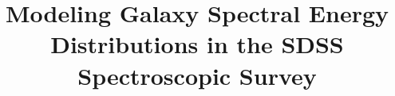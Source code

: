 \documentclass[10pt,preprint]{aastex}
\newcounter{address}
\begin{document}
 

\title{Modeling Galaxy Spectral Energy Distributions in the SDSS
Spectroscopic Survey}


\end{document}
